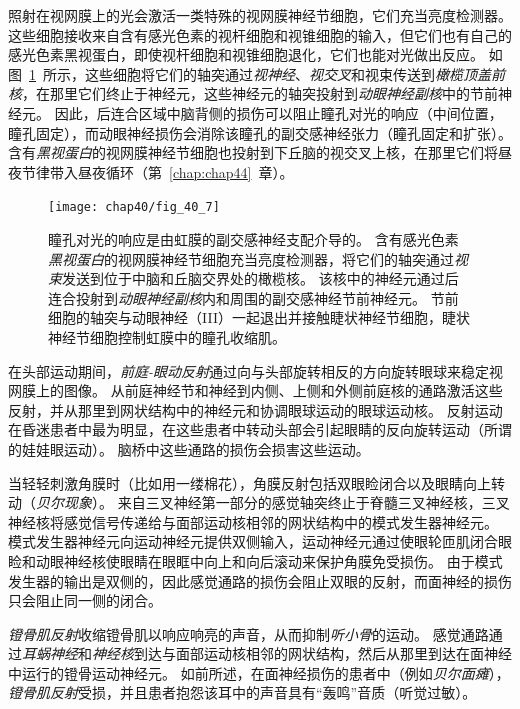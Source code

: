照射在视网膜上的光会激活一类特殊的视网膜神经节细胞，它们充当亮度检测器。
这些细胞接收来自含有感光色素的视杆细胞和视锥细胞的输入，但它们也有自己的感光色素黑视蛋白，即使视杆细胞和视锥细胞退化，它们也能对光做出反应。
如图~\ref{fig:40_7}~所示，这些细胞将它们的轴突通过\textit{视神经}、\textit{视交叉}和视束传送到\textit{橄榄顶盖前核}，在那里它们终止于神经元，这些神经元的轴突投射到\textit{动眼神经副核}中的节前神经元。
因此，后连合区域中脑背侧的损伤可以阻止瞳孔对光的响应（中间位置，瞳孔固定），而动眼神经损伤会消除该瞳孔的副交感神经张力（瞳孔固定和扩张）。
含有\textit{黑视蛋白}的视网膜神经节细胞也投射到下丘脑的视交叉上核，在那里它们将昼夜节律带入昼夜循环（第~\ref{chap:chap44}~章）。


\begin{figure}[htbp]
	\centering
	\texttt{[image: chap40/fig\_40\_7]}
	\caption{瞳孔对光的响应是由虹膜的副交感神经支配介导的。
		含有感光色素\textit{黑视蛋白}的视网膜神经节细胞充当亮度检测器，将它们的轴突通过\textit{视束}发送到位于中脑和丘脑交界处的橄榄核。
		该核中的神经元通过后连合投射到\textit{动眼神经副核}内和周围的副交感神经节前神经元。
		节前细胞的轴突与动眼神经（III）一起退出并接触睫状神经节细胞，睫状神经节细胞控制虹膜中的瞳孔收缩肌。}
	\label{fig:40_7}
\end{figure}


在头部运动期间，\textit{前庭-眼动反射}通过向与头部旋转相反的方向旋转眼球来稳定视网膜上的图像。
从前庭神经节和神经到内侧、上侧和外侧前庭核的通路激活这些反射，并从那里到网状结构中的神经元和协调眼球运动的眼球运动核。
反射运动在昏迷患者中最为明显，在这些患者中转动头部会引起眼睛的反向旋转运动（所谓的娃娃眼运动）。
脑桥中这些通路的损伤会损害这些运动。


当轻轻刺激角膜时（比如用一缕棉花），角膜反射包括双眼睑闭合以及眼睛向上转动（\textit{贝尔现象}）。
来自三叉神经第一部分的感觉轴突终止于脊髓三叉神经核，三叉神经核将感觉信号传递给与面部运动核相邻的网状结构中的模式发生器神经元。
模式发生器神经元向运动神经元提供双侧输入，运动神经元通过使眼轮匝肌闭合眼睑和动眼神经核使眼睛在眼眶中向上和向后滚动来保护角膜免受损伤。
由于模式发生器的输出是双侧的，因此感觉通路的损伤会阻止双眼的反射，而面神经的损伤只会阻止同一侧的闭合。


\textit{镫骨肌反射}收缩镫骨肌以响应响亮的声音，从而抑制\textit{听小骨}的运动。
感觉通路通过\textit{耳蜗神经}和\textit{神经核}到达与面部运动核相邻的网状结构，然后从那里到达在面神经中运行的镫骨运动神经元。
如前所述，在面神经损伤的患者中（例如\textit{贝尔面瘫}），\textit{镫骨肌反射}受损，并且患者抱怨该耳中的声音具有“轰鸣”音质（听觉过敏）。


